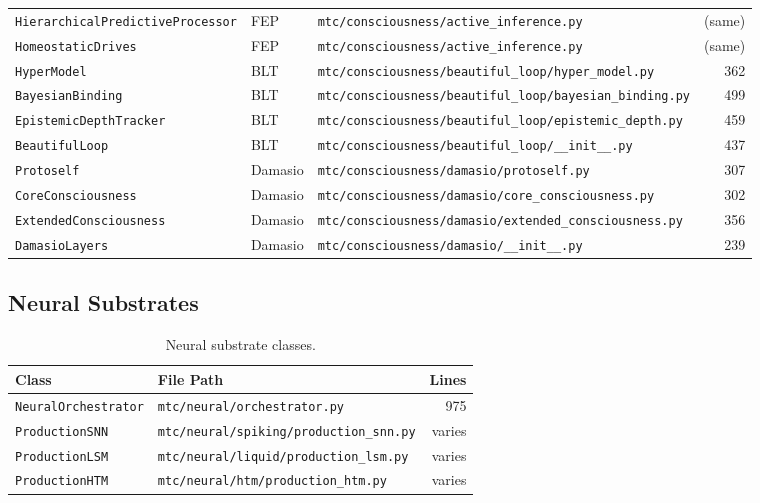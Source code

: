 \begin{longtable}{@{}llp{5.2cm}r@{}}
\texttt{HierarchicalPredictiveProcessor} & FEP  & \small\texttt{mtc/consciousness/active\_inference.py}                  & (same) \\
\texttt{HomeostaticDrives}             & FEP    & \small\texttt{mtc/consciousness/active\_inference.py}                  & (same) \\
\texttt{HyperModel}                    & BLT    & \small\texttt{mtc/consciousness/beautiful\_loop/hyper\_model.py}       & 362 \\
\texttt{BayesianBinding}               & BLT    & \small\texttt{mtc/consciousness/beautiful\_loop/bayesian\_binding.py}  & 499 \\
\texttt{EpistemicDepthTracker}         & BLT    & \small\texttt{mtc/consciousness/beautiful\_loop/epistemic\_depth.py}   & 459 \\
\texttt{BeautifulLoop}                 & BLT    & \small\texttt{mtc/consciousness/beautiful\_loop/\_\_init\_\_.py}       & 437 \\
\texttt{Protoself}                     & Damasio & \small\texttt{mtc/consciousness/damasio/protoself.py}                  & 307 \\
\texttt{CoreConsciousness}             & Damasio & \small\texttt{mtc/consciousness/damasio/core\_consciousness.py}        & 302 \\
\texttt{ExtendedConsciousness}         & Damasio & \small\texttt{mtc/consciousness/damasio/extended\_consciousness.py}    & 356 \\
\texttt{DamasioLayers}                 & Damasio & \small\texttt{mtc/consciousness/damasio/\_\_init\_\_.py}               & 239 \\
\end{longtable}

\subsection{Neural Substrates}

\begin{table}[ht]
\centering
\small
\begin{tabular}{@{}llr@{}}
\toprule
\textbf{Class} & \textbf{File Path} & \textbf{Lines} \\
\midrule
\texttt{NeuralOrchestrator} & \texttt{mtc/neural/orchestrator.py}            & 975 \\
\texttt{ProductionSNN}      & \texttt{mtc/neural/spiking/production\_snn.py} & varies \\
\texttt{ProductionLSM}      & \texttt{mtc/neural/liquid/production\_lsm.py}  & varies \\
\texttt{ProductionHTM}      & \texttt{mtc/neural/htm/production\_htm.py}      & varies \\
\bottomrule
\end{tabular}
\caption{Neural substrate classes.}
\label{tab:neural-files}
\end{table}

